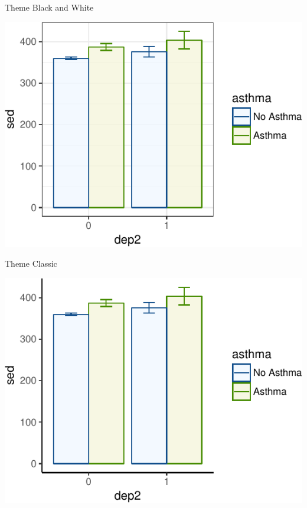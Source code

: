 \begin{frame}[fragile]{Theme Black and White}

\begin{Shaded}
\begin{Highlighting}[]
\OperatorTok{+}\StringTok{ }
\StringTok{  }\NormalTok{()}
\end{Highlighting}
\end{Shaded}

\includegraphics{09_AdvancedPlotting_files/figure-beamer/unnamed-chunk-6-1.pdf}

\end{frame}

\begin{frame}[fragile]{Theme Classic}

\begin{Shaded}
\begin{Highlighting}[]
\OperatorTok{+}\StringTok{ }
\StringTok{  }\NormalTok{()}
\end{Highlighting}
\end{Shaded}

\includegraphics{09_AdvancedPlotting_files/figure-beamer/unnamed-chunk-7-1.pdf}

\end{frame}

